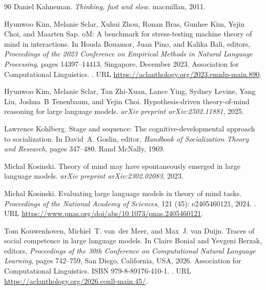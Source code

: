 \begin{thebibliography}{90}
Daniel Kahneman.
\newblock \emph{Thinking, fast and slow}.
\newblock macmillan, 2011.

Hyunwoo Kim, Melanie Sclar, Xuhui Zhou, Ronan Bras, Gunhee Kim, Yejin Choi, and Maarten Sap.
o{M}: A benchmark for stress-testing machine theory of mind in interactions.
\newblock In Houda Bouamor, Juan Pino, and Kalika Bali, editors, \emph{Proceedings of the 2023 Conference on Empirical Methods in Natural Language Processing}, pages 14397--14413, Singapore, December 2023. Association for Computational Linguistics.
\newblock {}.
\newblock URL \url{https://aclanthology.org/2023.emnlp-main.890}.

Hyunwoo Kim, Melanie Sclar, Tan Zhi-Xuan, Lance Ying, Sydney Levine, Yang Liu, Joshua~B Tenenbaum, and Yejin Choi.
\newblock Hypothesis-driven theory-of-mind reasoning for large language models.
\newblock \emph{arXiv preprint arXiv:2502.11881}, 2025.

Lawrence Kohlberg.
\newblock Stage and sequence: The cognitive-developmental approach to socialization.
\newblock In David~A. Goslin, editor, \emph{Handbook of Socialization Theory and Research}, pages 347--480. Rand McNally, 1969.

Michal Kosinski.
\newblock Theory of mind may have spontaneously emerged in large language models.
\newblock \emph{arXiv preprint arXiv:2302.02083}, 2023.

Michal Kosinski.
\newblock Evaluating large language models in theory of mind tasks.
\newblock \emph{Proceedings of the National Academy of Sciences}, 121 (45): e2405460121, 2024.
\newblock {}.
\newblock URL \url{https://www.pnas.org/doi/abs/10.1073/pnas.2405460121}.

Tom Kouwenhoven, Michiel~T. van~der Meer, and Max~J. van Duijn.
\newblock Traces of social competence in large language models.
\newblock In Claire Bonial and Yevgeni Berzak, editors, \emph{Proceedings of the 30th Conference on Computational Natural Language Learning}, pages 742--759, San Diego, California, USA, 2026. Association for Computational Linguistics.
\newblock ISBN 979-8-89176-410-1.
\newblock {}.
\newblock URL \url{https://aclanthology.org/2026.conll-main.45/}.


\end{thebibliography}
